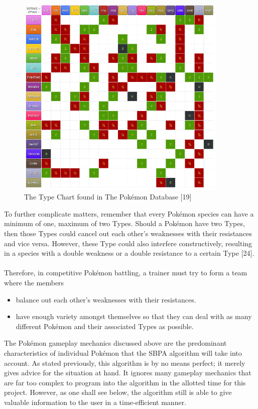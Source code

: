 \documentclass{article}
\begin{document}
\begin{figure}[H]
	\includegraphics[width=0.9\textwidth]{TypeChart.png}
	\centering
	\caption{The Type Chart found in The Pok\'emon Database [19]}
\end{figure}
To further complicate matters, remember that every Pok\'emon species can have a minimum of one, maximum of two Types. Should a Pok\'emon have two Types, then those Types could cancel out each other's weaknesses with their resistances and vice versa. However, these Type could also interfere constructively, resulting in a species with a double weakness or a double resistance to a certain Type [24].\\\\
Therefore, in competitive Pok\'emon battling, a trainer must try to form a team where the members
\begin{itemize}
	\item balance out each other's weaknesses with their resistances.
	\item have enough variety amongst themselves so that they can deal with as many different Pok\'emon and their associated Types as possible.
\end{itemize}
The Pok\'emon gameplay mechanics discussed above are the predominant characteristics of individual Pok\'emon that the SBPA algorithm will take into account. As stated previously, this algorithm is by no means perfect; it merely gives advice for the situation at hand. It ignores many gameplay mechanics that are far too complex to program into the algorithm in the allotted time for this project. However, as one shall see below, the algorithm still is able to give valuable information to the user in a time-efficient manner.
\end{document}
